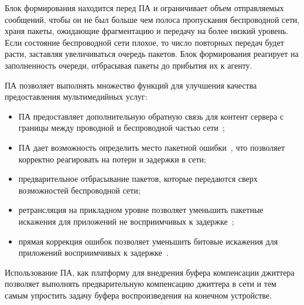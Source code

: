 Блок формирования находится перед ПА и ограничивает объем отправляемых сообщений, чтобы он не был больше чем полоса пропускания беспроводной сети, храня пакеты, ожидающие фрагментацию и передачу на более низкий уровень. Если состояние беспроводной сети плохое, то число повторных передач будет расти, заставляя увеличиваться очередь пакетов. Блок формирования реагирует на заполненность очереди, отбрасывая пакеты до прибытия их к агенту.

ПА позволяет выполнять множество функций для улучшения качества предоставления мультимедийных услуг:
\begin{itemize}
\item ПА предоставляет дополнительную обратную связь для контент сервера с границы между проводной  и беспроводной частью сети \cite{SAdouble_feedback};
\item ПА дает возможность определить место пакетной ошибки \cite{SAdouble_feedback}, что позволяет корректно реагировать на потери и задержки в сети;
\item предварительное отбрасывание пакетов, которые передаются сверх возможностей беспроводной сети;
\item ретрансляция на прикладном уровне позволяет уменьшить  пакетные искажения  для приложений не восприимчивых к задержке \cite{SArateOpt, SArealtime};
\item прямая коррекция ошибок позволяет уменьшить битовые искажения для приложений восприимчивых к задержке \cite{SArateOpt, SArealtime}.
\end{itemize}

Использование ПА, как платформу для внедрения буфера компенсации джиттера позволяет выполнять предварительную компенсацию джиттера в сети и тем самым упростить задачу буфера воспроизведения  на конечном устройстве.





